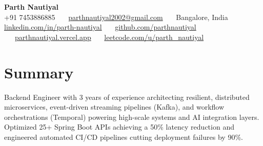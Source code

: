 \documentclass[a4paper,10pt]{article}
\begin{document}
\begin{center}
  \textbf{{\LARGE Parth Nautiyal}} \\ \vspace{2pt}
  \small
  +91 7453886885 \ \textbar\ \ \href{mailto:parthnautiyal2002@gmail.com}{parthnautiyal2002@gmail.com} \ \textbar\ \ Bangalore, India \\ \vspace{1pt}
  \href{https://linkedin.com/in/parth-nautiyal}{linkedin.com/in/parth-nautiyal} \ \textbar\ \ 
  \href{https://github.com/parthnautiyal}{github.com/parthnautiyal} \ \textbar\ \ 
  \href{https://parthnautiyal.vercel.app/}{parthnautiyal.vercel.app} \ \textbar\ \ 
  \href{https://leetcode.com/u/parth_nautiyal/}{leetcode.com/u/parth\_nautiyal}
\end{center}

\vspace{-4pt}
\section{Summary}
\vspace{1pt}
\begin{small}
Backend Engineer with 3 years of experience architecting resilient, distributed microservices, event-driven streaming pipelines (Kafka), and workflow orchestrations (Temporal) powering high-scale systems and AI integration layers. Optimized 25+ Spring Boot APIs achieving a 50\% latency reduction and engineered automated CI/CD pipelines cutting deployment failures by 90\%.
\end{small}

\vspace{1pt}
\end{document}
